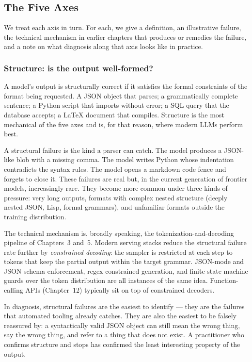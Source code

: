 \subsection{The Five Axes}

We treat each axis in turn. For each, we give a definition, an
illustrative failure, the technical mechanism in earlier chapters
that produces or remedies the failure, and a note on what diagnosis
along that axis looks like in practice.

\subsubsection{Structure: is the output well-formed?}

A model's output is structurally correct if it satisfies the formal
constraints of the format being requested. A JSON object that
parses; a grammatically complete sentence; a Python script that
imports without error; a SQL query that the database accepts; a
LaTeX document that compiles. Structure is the most mechanical of
the five axes and is, for that reason, where modern LLMs perform
best.

A structural failure is the kind a parser can catch. The model
produces a JSON-like blob with a missing comma. The model writes
Python whose indentation contradicts the syntax rules. The model
opens a markdown code fence and forgets to close it. These failures
are real but, in the current generation of frontier models,
increasingly rare. They become more common under three kinds of
pressure: very long outputs, formats with complex nested structure
(deeply nested JSON, Lisp, formal grammars), and unfamiliar formats
outside the training distribution.

The technical mechanism is, broadly speaking, the
tokenization-and-decoding pipeline of Chapters~3 and~5. Modern
serving stacks reduce the structural failure rate further by
\emph{constrained decoding}: the sampler is restricted at each step
to tokens that keep the partial output within the target grammar.
JSON-mode and JSON-schema enforcement, regex-constrained generation,
and finite-state-machine guards over the token distribution are all
instances of the same idea. Function-calling APIs (Chapter~12)
typically sit on top of constrained decoders.

In diagnosis, structural failures are the easiest to identify ---
they are the failures that automated tooling already catches. They
are also the easiest to be falsely reassured by: a syntactically
valid JSON object can still mean the wrong thing, say the wrong
thing, and refer to a thing that does not exist. A practitioner
who confirms structure and stops has confirmed the least
interesting property of the output.

